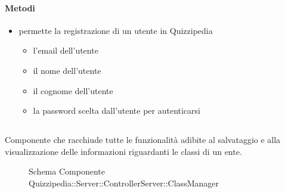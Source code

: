 \paragraph{Metodi}
\begin{itemize}
\item {}
\newline
permette la registrazione di un utente in Quizzipedia
\newline
{}
\newline
\begin{itemize}
\item {}
\newline
l'email dell'utente
\item {}
\newline
il nome dell'utente
\item {}
\newline
il cognome dell'utente
\item {}
\newline
la password scelta dall'utente per autenticarsi
\end{itemize}
\end{itemize}
\subsection{}
Componente che racchiude tutte le funzionalità adibite al salvataggio e alla visualizzazione delle informazioni riguardanti le classi di un ente.
\begin{figure}[H]
\centering
\noindent{}
\caption[Schema Componente Quizzipedia::Server::ControllerServer::ClassManager]{Schema Componente Quizzipedia::Server::ControllerServer::ClassManager}
\end{figure}
